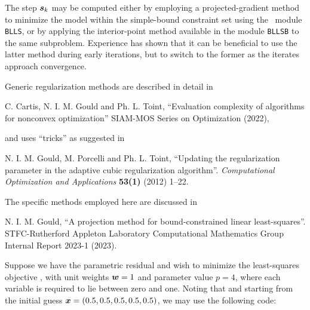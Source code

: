 \documentclass{galahad}
\begin{document}
The step ${\bm{s}}_k$ may be computed either by employing a projected-gradient
method to minimize the model within the simple-bound constraint set 
using the \galahad\ module {\tt BLLS}, or by
applying the interior-point method available in the module {\tt BLLSB}
to the same subproblem. Experience has shown that it can be beneficial
to use the latter method during early iterations, but to switch to the 
former as the iterates approach convergence.

\vspace*{1mm}

\galreferences
\vspace*{1mm}

\noindent
Generic regularization methods are described in detail in
\vspace*{1mm}

\noindent
C. Cartis,  N. I. M. Gould and Ph. L. Toint,
``Evaluation complexity of algorithms for nonconvex optimization''
SIAM-MOS Series on Optimization (2022),
\vspace*{1mm}

\noindent
and uses ``tricks'' as suggested in
\vspace*{1mm}

\noindent
N. I. M. Gould, M. Porcelli and Ph. L. Toint,
``Updating the regularization parameter in the adaptive cubic regularization
algorithm''.
{\em Computational Optimization and Applications}
{\bf 53(1)} (2012) 1--22.

\noindent
The specific methods employed here are discussed in
\vspace*{1mm}

\noindent
N. I. M. Gould,
``A projection method for bound-constrained linear least-squares''.
STFC-Rutherford Appleton Laboratory Computational Mathematics Group
Internal Report 2023-1 (2023).


\galexamples
Suppose we have the parametric residual
and wish to minimize the least-squares objective , with unit weights
${\bm{w}} = 1$ and parameter value $p = 4$, where each variable is required
to lie between zero and one.
Noting that 
and starting from the initial guess ${\bm{x}} = (0.5,0.5,0.5,0.5,0.5)$,
we may use the following code:
\end{document}
